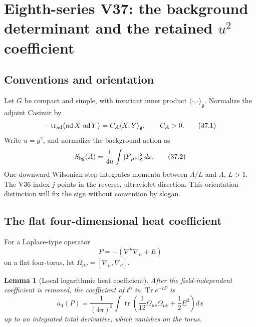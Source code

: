 \documentclass[11pt,oneside]{book}
\newtheorem{lemma}[theorem]{Lemma}
\theoremstyle{definition}
\theoremstyle{remark}
\begin{document}
\section{Eighth-series V37: the background determinant and the
retained \(u^2\) coefficient}

\subsection{Conventions and orientation}

Let \(G\) be compact and simple, with invariant inner product
\(\langle\cdot,\cdot\rangle_{\mathfrak g}\).  Normalize the adjoint
Casimir by
\[
 -\operatorname{tr}_{\rm ad}
 \bigl(\operatorname{ad}X\,\operatorname{ad}Y\bigr)
 =
 C_A\langle X,Y\rangle_{\mathfrak g},
 \qquad C_A>0.                                                   \tag{37.1}
\]
Write \(u=g^2\), and normalize the background action as
\[
 S_{\rm bg}(\overline A)
 =
 \frac1{4u}\int
 |\overline F_{\mu\nu}|_{\mathfrak g}^2\,dx.                    \tag{37.2}
\]
One downward Wilsonian step integrates momenta between
\(\Lambda/L\) and \(\Lambda\), \(L>1\).  The V36 index \(j\) points
in the reverse, ultraviolet direction.  This orientation distinction
will fix the sign without convention by slogan.

\subsection{The flat four-dimensional heat coefficient}

For a Laplace-type operator
\[
 P=-(\nabla^\mu\nabla_\mu+E)                                    \tag{37.3}
\]
on a flat four-torus, let
\(\Omega_{\mu\nu}=[\nabla_\mu,\nabla_\nu]\).

\begin{lemma}[Local logarithmic heat coefficient]
\label{lem:e8v37-heat}
After the field-independent coefficient is removed, the coefficient
of \(t^0\) in \(\operatorname{Tr}e^{-tP}\) is
\[
 a_4(P)=
 \frac1{(4\pi)^2}\int
 \operatorname{tr}\left(
 \frac1{12}\Omega_{\mu\nu}\Omega_{\mu\nu}
 +\frac12E^2
 \right)dx                                                       \tag{37.4}
\]
up to an integrated total derivative, which vanishes on the torus.
\end{lemma}
\end{document}
